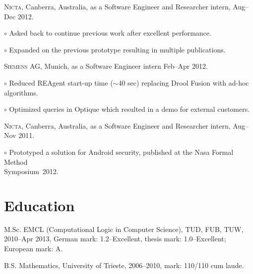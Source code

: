 \documentclass[letterpaper]{article}
\renewenvironment{itemize}{
  \begin{list}{}{
    \setlength{\leftmargin}{1.5em}
  }
}{
  \end{list}
}
\newenvironment{no-indent-itemize}{
  \begin{list}{}{
    \setlength{\leftmargin}{0em}
  }
}{
  \end{list}
}
\def\tilde{$\scriptstyle\sim$}
\def\bullet{$\circ$\xspace}
\begin{document}
\begin{no-indent-itemize}
  \item \textsc{Nicta}, Canberra, Australia, as a Software Engineer and Researcher intern, Aug--Dec 2012. 
  \begin{itemize}
	\item\bullet Asked back to continue previous work after excellent performance.
	\item\bullet Expanded on the previous prototype resulting in multiple publications.
  \end{itemize}
  \item \textsc{Siemens AG}, Munich, as a Software Engineer intern Feb--Apr 2012.
  \begin{itemize}
    \item\bullet Reduced REAgent start-up time (\tilde 40 sec) replacing Drool Fusion with 
          ad-hoc algorithms.
    \item\bullet Optimized queries in Optique which resulted in a demo for external customers.
  \end{itemize}
  \item \textsc{Nicta}, Canberra, Australia, as a Software Engineer and Researcher intern, Aug--Nov 2011. 
  \begin{itemize}
	\item\bullet Prototyped a solution for Android security, published at the Nasa Formal Method \\
	\phantom{\bullet }Symposium~2012.
  \end{itemize}
\end{no-indent-itemize}

\section*{Education}
\begin{no-indent-itemize}
  \item M.Sc. EMCL (Computational Logic in Computer Science), TUD, FUB, TUW, 2010--Apr 2013, 
        German mark: 1.2--Excellent, thesis mark: 1.0--Excellent; European mark: A.
  \item B.S. Mathematics, University of Trieste, 2006--2010, mark: 110/110 cum laude. 
\end{no-indent-itemize}
\end{document}
